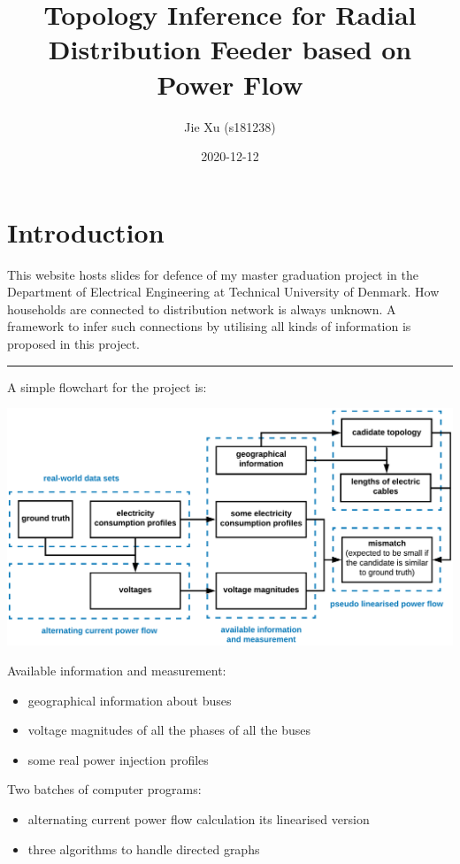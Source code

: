 \documentclass[
]{book}
\title{Topology Inference for Radial Distribution Feeder based on Power Flow}
\author{Jie Xu (s181238)}
\date{2020-12-12}
\providecommand{\tightlist}{%
  \setlength{\itemsep}{0pt}\setlength{\parskip}{0pt}}
\begin{document}
\maketitle

{
\setcounter{tocdepth}{1}
\tableofcontents
}
\hypertarget{introduction}{%
\chapter{Introduction}\label{introduction}}

This website hosts slides for defence of my master graduation project in the
Department of Electrical Engineering at Technical University of Denmark. How
households are connected to distribution network is always unknown. A framework
to infer such connections by utilising all kinds of information is proposed in
this project.

\begin{center}\rule{0.5\linewidth}{0.5pt}\end{center}

A simple flowchart for the project is:

\includegraphics{Pictures/figFlowchartSimple.png}

Available information and measurement:

\begin{itemize}
\tightlist
\item
  geographical information about buses
\item
  voltage magnitudes of all the phases of all the buses
\item
  some real power injection profiles
\end{itemize}

Two batches of computer programs:

\begin{itemize}
\tightlist
\item
  alternating current power flow calculation its linearised version
\item
  three algorithms to handle directed graphs
\end{itemize}
\end{document}
